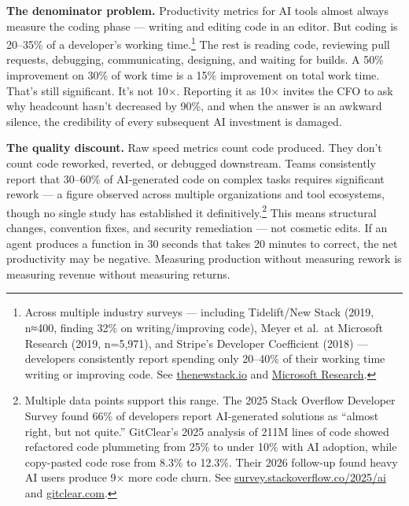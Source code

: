 \documentclass[
  a4paper,
  DIV=11,
  numbers=noendperiod]{scrreprt}
\begin{document}
\textbf{The denominator problem.} Productivity metrics for AI tools
almost always measure the coding phase --- writing and editing code in
an editor. But coding is 20--35\% of a developer's working
time.\footnote{Across multiple industry surveys --- including
  Tidelift/New Stack (2019, n≈400, finding 32\% on writing/improving
  code), Meyer et al.~at Microsoft Research (2019, n=5,971), and
  Stripe's Developer Coefficient (2018) --- developers consistently
  report spending only 20--40\% of their working time writing or
  improving code. See
  \href{https://thenewstack.io/how-much-time-do-developers-spend-actually-writing-code/}{thenewstack.io}
  and
  \href{https://www.microsoft.com/en-us/research/publication/today-was-a-good-day-the-daily-life-of-software-developers/}{Microsoft
  Research}.} The rest is reading code, reviewing pull requests,
debugging, communicating, designing, and waiting for builds. A 50\%
improvement on 30\% of work time is a 15\% improvement on total work
time. That's still significant. It's not 10×. Reporting it as 10×
invites the CFO to ask why headcount hasn't decreased by 90\%, and when
the answer is an awkward silence, the credibility of every subsequent AI
investment is damaged.

\textbf{The quality discount.} Raw speed metrics count code produced.
They don't count code reworked, reverted, or debugged downstream. Teams
consistently report that 30--60\% of AI-generated code on complex tasks
requires significant rework --- a figure observed across multiple
organizations and tool ecosystems, though no single study has
established it definitively.\footnote{Multiple data points support this
  range. The 2025 Stack Overflow Developer Survey found 66\% of
  developers report AI-generated solutions as ``almost right, but not
  quite.'' GitClear's 2025 analysis of 211M lines of code showed
  refactored code plummeting from 25\% to under 10\% with AI adoption,
  while copy-pasted code rose from 8.3\% to 12.3\%. Their 2026 follow-up
  found heavy AI users produce 9× more code churn. See
  \href{https://survey.stackoverflow.co/2025/ai}{survey.stackoverflow.co/2025/ai}
  and
  \href{https://www.gitclear.com/ai_assistant_code_quality_2025_research}{gitclear.com}.}
This means structural changes, convention fixes, and security
remediation --- not cosmetic edits. If an agent produces a function in
30 seconds that takes 20 minutes to correct, the net productivity may be
negative. Measuring production without measuring rework is measuring
revenue without measuring returns.
\end{document}
